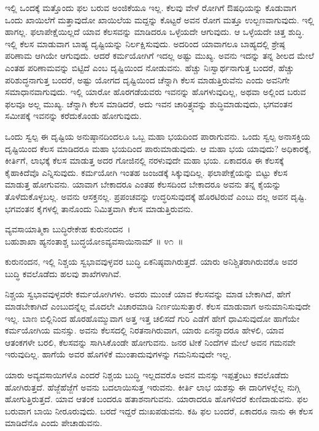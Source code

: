 ಇಲ್ಲಿ ಒಂದಕ್ಕೆ ಮತ್ತೊಂದು ಫಲ ಬರುವ ಅಂಜಿಕೆಯೂ ಇಲ್ಲ. ಕೆಲವು ವೇಳೆ ರೋಗಿಗೆ ಔಷಧಿಯನ್ನು ಕೊಡುವಾಗ ಒಂದು ಖಾಯಿಲೆಗೆ ಮತ್ತಾವುದೋ ಖಾಯಿಲೆಯ ಮದ್ದನ್ನು ಕೊಟ್ಟರೆ ಅವನ ರೋಗ ಮತ್ತೂ ಉಲ್ಬಣವಾಗುವುದು. ಇಲ್ಲಿ ಹಾಗಲ್ಲ. ಫಲಾಪೇಕ್ಷೆಯಿಲ್ಲದೆ ಯಾವ ಕೆಲಸವನ್ನು ಮಾಡಿದರೂ ಒಳ್ಳೆಯದೇ ಆಗುವುದು. ಆ ಒಳ್ಳೆಯದೇ ಚಿತ್ತ ಶುದ್ಧಿ. ಇಲ್ಲಿ ಕೆಲಸ ಮಾಡುವಾಗ ಬಾಹ್ಯ ದೃಷ್ಟಿಯನ್ನು ನಿರ್ಲಕ್ಷಿಸುವುದು. ಅದರಿಂದ ಯಾವಾಗಲೂ ಬಾಹ್ಯದಲ್ಲಿ ಶ್ರೇಷ್ಠ ಪರಿಣಾಮ ಆಗಿಯೇ ಆಗುವುದು. ಆದರೆ ಕರ್ಮಯೋಗಿಗೆ ಇದಲ್ಲ ಅಷ್ಟು ಮುಖ್ಯ. ಅವನು ಇದನ್ನು ತನ್ನ ಶೀಲದ ಮೇಲೆ ಎಂತಹ ಪರಿಣಾಮವನ್ನು ಬಿಟ್ಟಿದೆ ಎಂಬ ದೃಷ್ಟಿಯಿಂದ ನೋಡುವನು. ಹೆಚ್ಚು ನಿಃಸ್ವಾರ್ಥನಾಗುತ್ತ ಬಂದರೆ, ಹೆಚ್ಚು ಪರಿಶುದ್ಧನಾಗುತ್ತ ಬಂದರೆ, ಅಷ್ಟು ಯೋಗದ ದೃಷ್ಟಿಯಿಂದ ಚೆನ್ನಾಗಿ ಕೆಲಸ ಮಾಡುತ್ತಿರುವೆನು ಎಂದು ಅವನಿಗೇ ಸಮಾಧಾನವಾಗುವುದು. ಇಲ್ಲಿ ಯಾರೋ ಹೊರಗಡೆಯವರು ಇವನನ್ನು ಹೊಗಳುವುದಿಲ್ಲ, ಅಥವಾ ಅಲ್ಲಿಂದ ಬರುವ ಫಲವೂ ಅಲ್ಲ ಮುಖ್ಯ. ಚೆನ್ನಾಗಿ ಕೆಲಸ ಮಾಡಿದರೆ, ಅದು ಇವನ ಚಾರಿತ್ರ್ಯವನ್ನು ಶುದ್ಧಿಮಾಡುವುದು, ಭಗವಂತನ ಸಮೀಪಕ್ಕೆ ಇವನನ್ನು ಕರೆದುಕೊಂಡು ಹೋಗುವುದು.

ಒಂದು ಸ್ವಲ್ಪ ಈ ದೃಷ್ಟಿಯ ಅನುಷ್ಠಾನದಿಂದಲೂ ಒಬ್ಬ ಮಹಾ ಭಯದಿಂದ ಪಾರಾಗುವನು. ಒಂದು ಸ್ವಲ್ಪ ಅನಾಸಕ್ತಿಯ ದೃಷ್ಟಿಯಿಂದ ಕೆಲಸ ಮಾಡಿದರೂ ಮಹಾ ಭಯದಿಂದ ಪಾರುಮಾಡುವುದು. ಆ ಮಹಾ ಭಯ ಯಾವುದು? ಅಧಿಕಾರಕ್ಕೆ, ಕೀರ್ತಿಗೆ, ಲಾಭಕ್ಕೆ ಕೆಲಸ ಮಾಡುತ್ತ ಅದರ ಗೋಜಿನಲ್ಲಿ ನರಳುವುದೇ ಮಹಾ ಭಯ. ಏಕಾದರೂ ಈ ಕೆಲಸಕ್ಕೆ ಕೈಹಾಕಿದೆವೊ ಎನ್ನಿಸುವುದು. ಕರ್ಮಯೋಗಿ ಇಂತಹ ಜಂಜಡಕ್ಕೆ ಸಿಕ್ಕುವುದಿಲ್ಲ. ಫಲಾಪೇಕ್ಷೆಯನ್ನು ಬಿಟ್ಟು ಕೆಲಸ ಮಾಡುತ್ತ ಹೋಗುವನು. ಯಾವಾಗ ಬೇಕಾದರೂ ಎಂತಹ ಕೆಲಸದಿಂದ ಬೇಕಾದರೂ ಅವನು ತನ್ನ ಕೈಯನ್ನು ತೊಳೆದುಕೊಳ್ಳಬಲ್ಲ. ಅವನು ಆಸಕ್ತನಲ್ಲ. ಪ್ರಪಂಚವನ್ನು ಉದ್ಧರಿಸುವುದಕ್ಕೆ ಹೊರಟಿರುವೆ ಎಂಬು ದಲ್ಲ ಅವನ ದೃಷ್ಟಿ. ಭಗವಂತನ ಕೈಗಳಲ್ಲಿ ತಾನೊಂದು ನಿಮಿತ್ತವಾಗಿ ಕೆಲಸ ಮಾಡುತ್ತಿರುವನು.

\begin{shloka}
ವ್ಯವಸಾಯಾತ್ಮಿಕಾ ಬುದ್ಧಿರೇಕೇಹ ಕುರುನಂದನ~।\\ಬಹುಶಾಖಾ ಹ್ಯನಂತಾಶ್ಚ ಬುದ್ಧಯೋಽವ್ಯವಸಾಯಿನಾಮ್ \hfill॥ ೪೧~॥
\end{shloka}

\begin{artha}
ಕುರುನಂದನ, ಇಲ್ಲಿ ನಿಶ್ಚಯ ಸ್ವಭಾವವುಳ್ಳವರ ಬುದ್ಧಿ ಏಕನಿಷ್ಠವಾಗಿರುತ್ತದೆ. ಯಾರು ಅನಿಶ್ಚಿತ\-ರಾಗಿರುವರೊ ಅವರ ಬುದ್ಧಿ ಕವಲೊಡೆದು ಹಲವು ಶಾಖೆಗಳಾಗಿವೆ.
\end{artha}

ನಿಶ್ಚಯ ಸ್ವಭಾವವುಳ್ಳವರೇ ಕರ್ಮಯೋಗಿಗಳು. ಅವರು ಮುಂಚೆ ಯಾವ ಕೆಲಸವನ್ನು ಮಾಡ ಬೇಕಾಗಿದೆ, ಹೇಗೆ ಮಾಡಬೇಕಾಗಿದೆ ಎಂಬುದನ್ನೆಲ್ಲ ಮೊದಲೇ ವಿಚಾರಮಾಡಿ ನಿರ್ಣಯಿಸು\-ತ್ತಾರೆ. ಕೆಲಸ ಮಾಡುವಾಗ ಅನುಮಾನಿಸುವುದೇ ಇಲ್ಲ. ಬಾಣ ಬಿಲ್ಲಿನಿಂದ ಹೊರಹೊಮ್ಮುವಾಗ ಅತ್ತ ಇತ್ತ ಚಲಿಸದೆ ಗುರಿ ಎಡೆಗೆ ಹೇಗೆ ಧಾವಿಸುವುದೋ ಹಾಗೆಯೇ ಕರ್ಮಯೋಗಿಯ ಮನಸ್ಸು. ಅವನು ಕೆಲಸದಲ್ಲಿ ನಿರತನಾಗಿರುವಾಗ, ಯಾರು ಏನನ್ನಾದರೂ ಹೇಳಲಿ, ಯಾವ ಆತಂಕಗಳೇ ಬರಲಿ, ಕೆಲಸವನ್ನು ಸಾಗಿಸಿಕೊಂಡೇ ಹೋಗುವನು. ಜನರ ಟೀಕೆ ನಿಂದೆಗಳ ಮೇಲೆ ಅವನ ಗಮನವೇ ಇರುವುದಿಲ್ಲ. ಹಾಗೆಯೆ ಅವರ ಹೊಗಳಿಕೆ ಮುಂತಾದುವುಗಳನ್ನು ಗಮನಿಸುವುದೇ ಇಲ್ಲ.

ಯಾರು ಅವ್ಯವಸಾಯಿಗಳೊ ಎಂದರೆ ನಿಶ್ಚಯ ಬುದ್ಧಿ ಇಲ್ಲದವರೊ ಅವನ ಮನಸ್ಸು ಇಪ್ಪತ್ತೆಂಟು ಕವಲೊಡೆದು ಹೋಗಿರುತ್ತದೆ. ಹೆಜ್ಜೆಹೆಜ್ಜೆಗೆ ಅವನು ಬದಲಾಯಿಸುತ್ತ ಇರುವನು. ಕೀರ್ತಿ ಲಾಭ ಯಶಸ್ಸು ಈ ದಾರಿಗಳಲ್ಲೆಲ್ಲ ನುಗ್ಗಿ ಹೋಗುತ್ತಿರುತ್ತದೆ. ಯಾವ ಆತಂಕ ಬಂದರೂ ಹತಾಶನಾಗುವನು. ಯಾರಾದರೂ ಹೊಗಳಿದರೆ ಕುಣಿದಾಡುವನು. ಫಲ ಬರುವಾಗ ಬಾಯಿ ನೀರೂರುವುದು. ಬರದೆ ಇದ್ದರೆ ದುಃಖಪಡುವನು. ಕಹಿ ಫಲ ಬಂದರೆ, ಏಕಾದರೂ ನಾನು ಈ ಕೆಲಸ ಮಾಡಿದೆನೊ ಎಂದು ಪೇಚಾಡುವನು.

